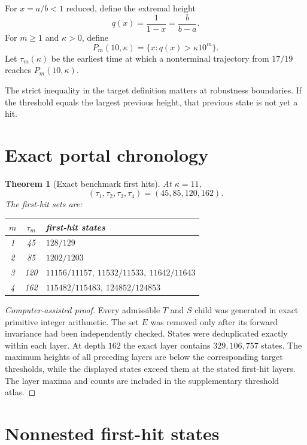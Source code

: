 \documentclass[11pt]{amsart}
\newtheorem{theorem}{Theorem}[section]
\theoremstyle{definition}
\begin{document}
For $x=a/b<1$ reduced, define the extremal height
\[
q(x)=\frac1{1-x}=\frac{b}{b-a}.
\]
For $m\ge1$ and $\kappa>0$, define
\[
P_m(10,\kappa)=\{x:q(x)>\kappa 10^m\}.
\]
Let $\tau_m(\kappa)$ be the earliest time at which a nonterminal trajectory from $17/19$ reaches $P_m(10,\kappa)$.

The strict inequality in the target definition matters at robustness boundaries.  If the threshold equals the largest previous height, that previous state is not yet a hit.

\section{Exact portal chronology}

\begin{theorem}[Exact benchmark first hits]
At $\kappa=11$,
\[
\boxed{(\tau_1,\tau_2,\tau_3,\tau_4)=(45,85,120,162).}
\]
The first-hit sets are:
\begin{center}
\begin{tabular}{ccl}
\toprule
$m$ & $\tau_m$ & first-hit states\\
\midrule
1&45&$128/129$\\
2&85&$1202/1203$\\
3&120&$11156/11157,\ 11532/11533,\ 11642/11643$\\
4&162&$115482/115483,\ 124852/124853$\\
\bottomrule
\end{tabular}
\end{center}
\end{theorem}

\begin{proof}[Computer-assisted proof]
Every admissible $T$ and $S$ child was generated in exact primitive integer arithmetic.  The set $E$ was removed only after its forward invariance had been independently checked.  States were deduplicated exactly within each layer.  At depth $162$ the exact layer contains $329{,}106{,}757$ states.  The maximum heights of all preceding layers are below the corresponding target thresholds, while the displayed states exceed them at the stated first-hit layers.  The layer maxima and counts are included in the supplementary threshold atlas.
\end{proof}

\section{Nonnested first-hit states}
\end{document}
